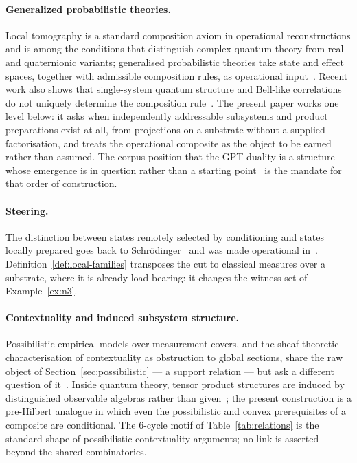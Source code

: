\documentclass[11pt,a4paper]{article}
\begin{document}
    \paragraph{Generalized probabilistic theories.}
    Local tomography is a standard composition axiom in operational reconstructions and is among the
    conditions that distinguish complex quantum theory from real and quaternionic variants; generalised
    probabilistic theories take state and effect spaces, together with admissible composition rules, as
    operational input~\cite{Hardy2001,Barrett2007,ChiribellaDArianoPerinotti2011}.
    Recent work also shows that single-system quantum structure and Bell-like correlations do not uniquely
    determine the composition rule~\cite{ErbaPerinotti2024}.
    The present paper works one level below: it asks when independently addressable subsystems and product
    preparations exist at all, from projections on a substrate without a supplied factorisation, and treats
    the operational composite as the object to be earned rather than assumed.
    The corpus position that the GPT duality is a structure whose emergence is in question rather than a
    starting point~\cite{Beau2026l} is the mandate for that order of construction.

    \paragraph{Steering.}
    The distinction between states remotely selected by conditioning and states locally prepared goes back
    to Schr\"{o}dinger~\cite{Schrodinger1935,Schrodinger1936} and was made operational
    in~\cite{WisemanJonesDoherty2007}.
    Definition~\ref{def:local-families} transposes the cut to classical measures over a substrate, where it
    is already load-bearing: it changes the witness set of Example~\ref{ex:n3}.

    \paragraph{Contextuality and induced subsystem structure.}
    Possibilistic empirical models over measurement covers, and the sheaf-theoretic characterisation of
    contextuality as obstruction to global sections, share the raw object of
    Section~\ref{sec:possibilistic} --- a support relation --- but ask a different question of
    it~\cite{AbramskyBrandenburger2011}.
    Inside quantum theory, tensor product structures are induced by distinguished observable algebras
    rather than given~\cite{Zanardi2001,ZanardiLidarLloyd2004}; the present construction is a pre-Hilbert
    analogue in which even the possibilistic and convex prerequisites of a composite are conditional.
    The 6-cycle motif of Table~\ref{tab:relations} is the standard shape of possibilistic contextuality
    arguments; no link is asserted beyond the shared combinatorics.
\end{document}
